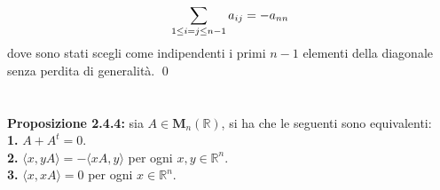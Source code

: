 \documentclass{article}
\begin{document}
\begin{gather}
    \sum_{1 \leq i = j \leq n - 1} a_{ij} = - a_{nn} \notag
\end{gather}
dove sono stati scegli come indipendenti i primi $n - 1$ elementi della diagonale senza perdita di generalità. \qed \\ \\ \\
\textbf{Proposizione 2.4.4:} sia $A \in \mathbf{M}_n(\mathbb{R})$, si ha che le seguenti sono equivalenti: \\
\textbf{1.} $A + A^t = 0$. \\
\textbf{2.} $\langle x, yA \rangle = -\langle xA, y \rangle$ per ogni $x, y \in \mathbb{R}^n$. \\
\textbf{3.} $\langle x, xA \rangle = 0$ per ogni $x \in \mathbb{R}^n$. \\
\end{document}
